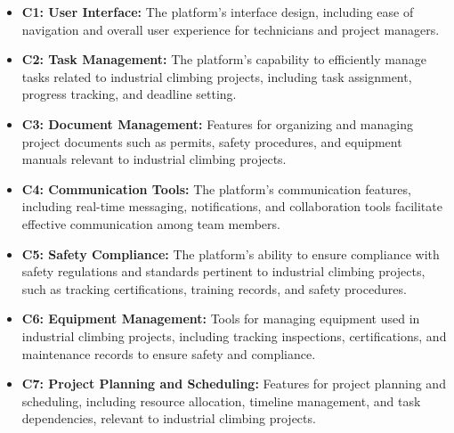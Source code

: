 \begin{itemize}
    \item \textbf{C1: User Interface:} The platform's interface design, including ease of navigation and overall user experience for technicians and project managers.
    \item \textbf{C2: Task Management:} The platform's capability to efficiently manage tasks related to industrial climbing projects, including task assignment, progress tracking, and deadline setting.
    \item \textbf{C3: Document Management:} Features for organizing and managing project documents such as permits, safety procedures, and equipment manuals relevant to industrial climbing projects.
    \item \textbf{C4: Communication Tools:} The platform's communication features, including real-time messaging, notifications, and collaboration tools facilitate effective communication among team members.
    \item \textbf{C5: Safety Compliance:} The platform's ability to ensure compliance with safety regulations and standards pertinent to industrial climbing projects, such as tracking certifications, training records, and safety procedures.
    \item \textbf{C6: Equipment Management:} Tools for managing equipment used in industrial climbing projects, including tracking inspections, certifications, and maintenance records to ensure safety and compliance.
    \item \textbf{C7: Project Planning and Scheduling:} Features for project planning and scheduling, including resource allocation, timeline management, and task dependencies, relevant to industrial climbing projects.
\end{itemize}

